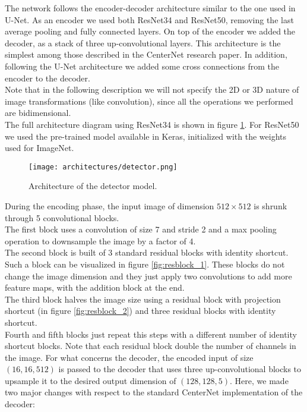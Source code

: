 The network follows the encoder-decoder architecture similar to the one used in U-Net. As an encoder we used both ResNet34 and ResNet50, removing the last average pooling and fully connected layers. On top of the encoder we added the decoder, as a stack of three up-convolutional layers. This architecture is the simplest among those described in the CenterNet research paper. In addition, following the U-Net architecture we added some cross connections from the encoder to the decoder.\\
Note that in the following description we will not specify the 2D or 3D nature of image transformations (like convolution), since all the operations we performed are bidimensional.\\
The full architecture diagram using ResNet34 is shown in figure \ref{fig:detector}. For ResNet50 we used the pre-trained model available in Keras, initialized with the weights used for ImageNet.\\

\begin{figure}[h]
	\caption{Architecture of the detector model.}
	\centering
	\texttt{[image: architectures/detector.png]}
	\label{fig:detector}
\end{figure}

\noindent During the encoding phase, the input image of dimension $512 \times 512$ is shrunk through 5 convolutional blocks.\\
The first block uses a convolution of size 7 and stride 2 and a max pooling operation to downsample the image by a factor of 4.\\
The second block is built of 3 standard residual blocks with identity shortcut. Such a block can be visualized in figure \ref{fig:resblock_1}. These blocks do not change the image dimension and they just apply two convolutions to add more feature maps, with the addition block at the end.\\
The third block halves the image size using a residual block with projection shortcut (in figure \ref{fig:resblock_2}) and three residual blocks with identity shortcut.\\
Fourth and fifth blocks just repeat this steps with a different number of identity shortcut blocks. Note that each residual block double the number of channels in the image. For what concerns the decoder, the encoded input of size $(16, 16, 512)$ is passed to the decoder that uses three up-convolutional blocks to upsample it to the desired output dimension of $(128, 128, 5)$. Here, we made two major changes with respect to the standard CenterNet implementation of the decoder:

